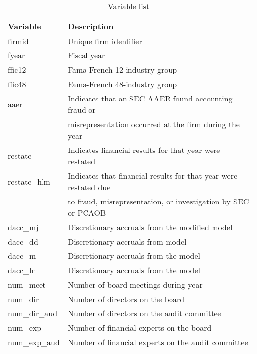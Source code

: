 \documentclass[11pt]{amsart}
\begin{document}
\begin{table}[h]
\caption{Variable list} \label{tab:vars}
    \begin{tabular}{ll}
    \textbf{Variable} & \textbf{Description } \\
    \hline
        firmid        & Unique firm identifier \\
        fyear         & Fiscal year \\
        ffic12        & Fama-French 12-industry group  \\
        ffic48        & Fama-French 48-industry group \\
        aaer          & Indicates that an SEC AAER found accounting fraud or  \\
                      & misrepresentation occurred at the firm during the year \\
        restate       & Indicates financial results for that year were restated \\
        restate\_hlm  & Indicates that financial results for that year were restated due \\
                      & to fraud, misrepresentation, or investigation by SEC or PCAOB \\
        dacc\_mj      & Discretionary accruals from the modified \citet{Jones:1991ib} model \\
        dacc\_dd      & Discretionary accruals from \cite{Dechow:2002} model \\
        dacc\_m       & Discretionary accruals from the \citet{McNichols:2002} model \\
        dacc\_lr      & Discretionary accruals from the \citet{Larcker:2004ft} model \\
        num\_meet     & Number of board meetings during year \\
        num\_dir      & Number of directors on the board \\
        num\_dir\_aud & Number of directors on the audit committee \\
        num\_exp      & Number of financial experts on the board \\
        num\_exp\_aud & Number of financial experts on the audit committee 
\end{tabular}    
\end{table}



\end{document}
